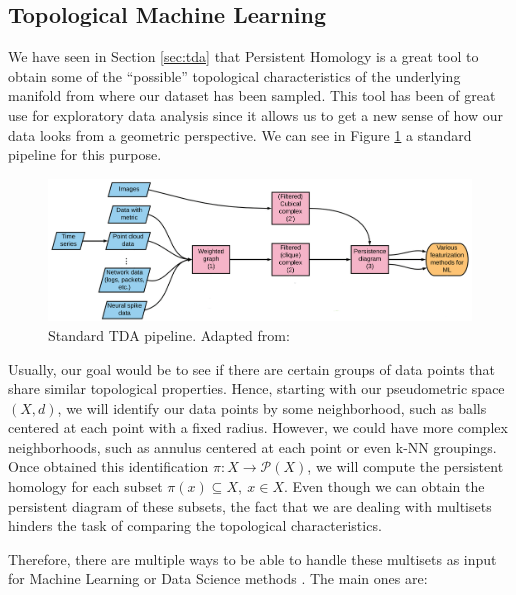 \documentclass[../main.tex]{subfiles}
\begin{document}
\subsection{Topological Machine Learning}
\label{sec:topoML}

We have seen in Section \ref{sec:tda} that Persistent Homology is a great tool to obtain some of the ``possible'' topological characteristics of the underlying manifold from where our dataset has been sampled. This tool has been of great use for exploratory data analysis \cite{cheng_application_2020, topaz_topological_2015, amezquita_shape_2020} since it allows us to get a new sense of how our data looks from a geometric perspective. We can see in Figure \ref{fig:tdaPipe} a standard pipeline for this purpose.

\begin{figure}[!ht]
\centering
\includegraphics[width=\textwidth]{figures/bg/pipelineTDA.png} 
\caption{Standard TDA pipeline. Adapted from: \cite{berwald_mathematics_2019}}
\label{fig:tdaPipe}
\end{figure}


Usually, our goal would be to see if there are certain groups of data points that share similar topological properties. Hence, starting with our pseudometric space $(X, d)$, we will identify our data points by some neighborhood, such as balls centered at each point with a fixed radius. However, we could have more complex neighborhoods, such as annulus centered at each point or even k-NN groupings. Once obtained this identification $\pi: X \to \mathcal{P}(X)$, we will compute the persistent homology for each subset $\pi(x) \subseteq X,\ x \in X$.  Even though we can obtain the persistent diagram of these subsets, the fact that we are dealing with multisets hinders the task of comparing the topological characteristics. 

Therefore, there are multiple ways to be able to handle these multisets as input for Machine Learning or Data Science methods \cite{hensel_survey_2021}. The main ones are:
\end{document}
